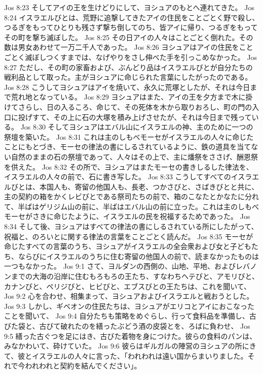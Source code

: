 Jos 8:23  そしてアイの王を生けどりにして、ヨシュアのもとへ連れてきた。
Jos 8:24  イスラエルびとは、荒野に追撃してきたアイの住民をことごとく野で殺し、つるぎをもってひとりも残さず撃ち倒してのち、皆アイに帰り、つるぎをもってその町を撃ち滅ぼした。
Jos 8:25  その日アイの人々はことごとく倒れた。その数は男女あわせて一万二千人であった。
Jos 8:26  ヨシュアはアイの住民をことごとく滅ぼしつくすまでは、なげやりをさし伸べた手を引っこめなかった。
Jos 8:27  ただし、その町の家畜および、ぶんどり品はイスラエルびとが自分たちの戦利品として取った。主がヨシュアに命じられた言葉にしたがったのである。
Jos 8:28  こうしてヨシュアはアイを焼いて、永久に荒塚としたが、それは今日まで荒れ地となっている。
Jos 8:29  ヨシュアはまた、アイの王を夕方まで木に掛けてさらし、日の入るころ、命じて、その死体を木から取りおろし、町の門の入口に投げすて、その上に石の大塚を積み上げさせたが、それは今日まで残っている。
Jos 8:30  そしてヨシュアはエバル山にイスラエルの神、主のために一つの祭壇を築いた。
Jos 8:31  これは主のしもべモーセがイスラエルの人々に命じたことにもとづき、モーセの律法の書にしるされているように、鉄の道具を当てない自然のままの石の祭壇であって、人々はその上で、主に燔祭をささげ、酬恩祭を供えた。
Jos 8:32  その所で、ヨシュアはまたモーセの書きしるした律法を、イスラエルの人々の前で、石に書き写した。
Jos 8:33  こうしてすべてのイスラエルびとは、本国人も、寄留の他国人も、長老、つかさびと、さばきびとと共に、主の契約の箱をかくレビびとである祭司たちの前で、箱のこなたとかなたに分れて、半ばはゲリジム山の前に、半ばはエバル山の前に立った。これは主のしもべモーセがさきに命じたように、イスラエルの民を祝福するためであった。
Jos 8:34  そして後、ヨシュアはすべての律法の書にしるされている所にしたがって、祝福と、のろいとに関する律法の言葉をことごとく読んだ。
Jos 8:35  モーセが命じたすべての言葉のうち、ヨシュアがイスラエルの全会衆および女と子どもたち、ならびにイスラエルのうちに住む寄留の他国人の前で、読まなかったものは一つもなかった。
Jos 9:1  さて、ヨルダンの西側の、山地、平地、およびレバノンまでの大海の沿岸に住むもろもろの王たち、すなわちヘテびと、アモリびと、カナンびと、ペリジびと、ヒビびと、エブスびとの王たちは、これを聞いて、
Jos 9:2  心を合わせ、相集まって、ヨシュアおよびイスラエルと戦おうとした。
Jos 9:3  しかし、ギベオンの住民たちは、ヨシュアがエリコとアイにおこなったことを聞いて、
Jos 9:4  自分たちも策略をめぐらし、行って食料品を準備し、古びた袋と、古びて破れたのを繕ったぶどう酒の皮袋とを、ろばに負わせ、
Jos 9:5  繕った古ぐつを足にはき、古びた着物を身につけた。彼らの食料のパンは、みなかわいて、砕けていた。
Jos 9:6  彼らはギルガルの陣営のヨシュアの所にきて、彼とイスラエルの人々に言った、「われわれは遠い国からまいりました。それで今われわれと契約を結んでください」。
